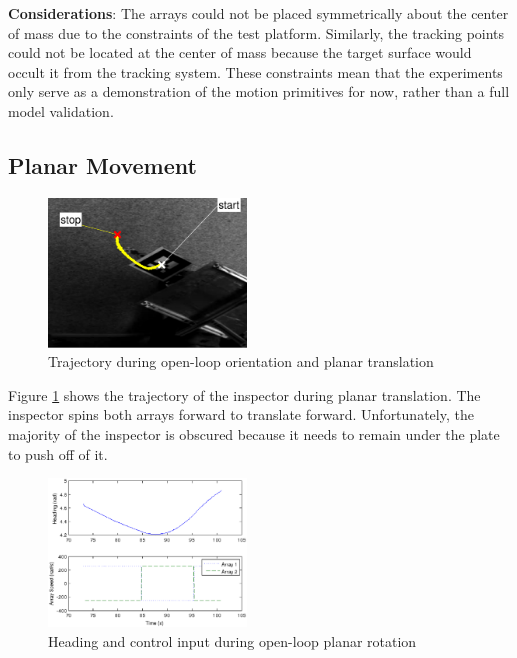 \documentclass[letterpaper, 10 pt, conference]{ieeeconf}  %
\begin{document}
\par \textbf{Considerations}: The arrays could not be placed symmetrically about the center of mass due to the constraints of the test platform. Similarly, the tracking points could not be located at the center of mass because the target surface would occult it from the tracking system. These constraints mean that the experiments only serve as a demonstration of the motion primitives for now, rather than a full model validation. 

\subsection{Planar Movement}\label{sec:planar_movement_exp}
   
   \begin{figure}[thpb]
      \centering
      \includegraphics[width = 0.47\textwidth]{figures/planar_translation.eps}
      \caption{Trajectory during open-loop orientation and planar translation}
      \label{fig:planar_translation_exp_trajectory}
   \end{figure}
   
   Figure \ref{fig:planar_translation_exp_trajectory} shows the trajectory of the inspector during planar translation. The inspector spins both arrays forward to translate forward. Unfortunately, the majority of the inspector is obscured because it needs to remain under the plate to push off of it. 
   

      \begin{figure}[thpb]
      \centering
      \includegraphics[width = 0.47\textwidth]{figures/planar_rotation.eps}
      \caption{Heading and control input during open-loop planar rotation}
      \label{fig:planar_rotation_exp}
   \end{figure}
   
\end{document}
